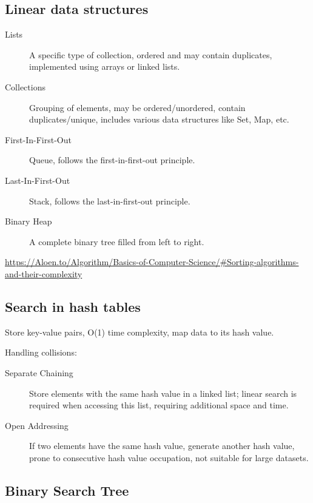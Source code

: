 \documentclass[11pt,journal,compsoc]{IEEEtran}
\begin{document}
\subsection{Linear data structures}

\begin{description}
    \item[Lists] A specific type of collection, ordered and may contain duplicates, implemented using arrays or linked lists.
    
    \item[Collections] Grouping of elements, may be ordered/unordered, contain duplicates/unique, includes various data structures like Set, Map, etc.
    
    \item[First-In-First-Out] Queue, follows the first-in-first-out principle.
    
    \item[Last-In-First-Out] Stack, follows the last-in-first-out principle.
    
    \item[Binary Heap] A complete binary tree filled from left to right.
\end{description}

\url{https://Aloen.to/Algorithm/Basics-of-Computer-Science/#Sorting-algorithms-and-their-complexity}


\subsection{Search in hash tables}

Store key-value pairs, O(1) time complexity, map data to its hash value.

Handling collisions:

\begin{description}
    \item[Separate Chaining] Store elements with the same hash value in a linked list; linear search is required when accessing this list, requiring additional space and time.
    
    \item[Open Addressing] If two elements have the same hash value, generate another hash value, prone to consecutive hash value occupation, not suitable for large datasets.
\end{description}


\subsection{Binary Search Tree}
\end{document}
